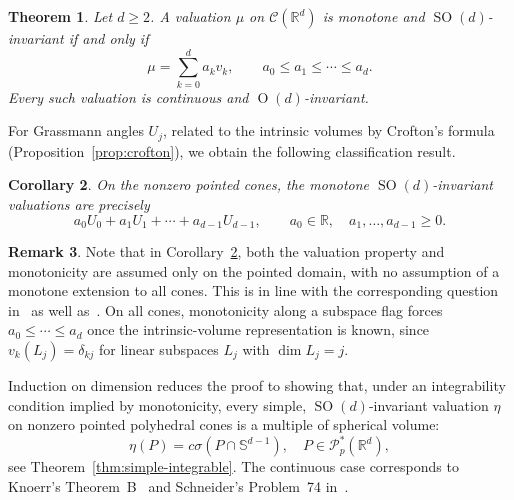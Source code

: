 \documentclass[11pt]{article}
\newcommand{\R}{\mathbb{R}}
\newcommand{\CC}{\mathcal{C}}
\newcommand{\PP}{\mathcal{P}}
\newcommand{\sphere}[1]{\mathbb{S}^{#1}}
\newcommand{\SOn}[1]{\operatorname{SO}(#1)}
\newcommand{\On}[1]{\operatorname{O}(#1)}
\theoremstyle{plain}
\newtheorem{theorem}{Theorem}[section]
\newtheorem{corollary}[theorem]{Corollary}
\theoremstyle{definition}
\newtheorem{remark}[theorem]{Remark}
\begin{document}
\begin{theorem}\label{thm:global-classification}
  Let $d\ge2$.  A valuation $\mu$ on $\CC(\R^d)$ is monotone and
  $\SOn d$-invariant if and only if
  \begin{equation}\label{eq:global-classification}
    \mu=\sum_{k=0}^{d}a_kv_k,
    \qquad a_0\le a_1\le\cdots\le a_d.
  \end{equation}
  Every such valuation is continuous and
  $\On d$-invariant.
  \end{theorem}

For Grassmann angles $U_j$, related to the intrinsic volumes by Crofton's
formula (Proposition~\ref{prop:crofton}), we obtain the following
classification result.

  \begin{corollary}\label{cor:problem49}
    On the nonzero pointed cones, the
    monotone $\SOn d$-invariant valuations
    are precisely
    \[
      a_0U_0+a_1U_1+\cdots+a_{d-1}U_{d-1},
      \qquad a_0\in\R,\quad a_1,\ldots,a_{d-1}\ge0.
    \]
    \end{corollary}

\begin{remark}\label{rem:monotonicity-domains}
Note that in Corollary~\ref{cor:problem49}, both the valuation property and
  monotonicity are assumed only on the pointed domain, with no assumption
  of a monotone extension to all cones. This is in line with the corresponding question in~\cite[Section~3.3, p.~126]{Sch22:Convex-Cones} as well as~\cite[Problem~49]{Gruber1979}.
On all cones, monotonicity along a subspace flag forces
$a_0\le\cdots\le a_d$ once the intrinsic-volume representation is known,
since $v_k(L_j)=\delta_{kj}$ for linear subspaces $L_j$ with $\dim L_j=j$.
\end{remark}


Induction on dimension reduces the proof to showing that, under an
integrability condition implied by monotonicity, every simple,
$\SOn d$-invariant valuation $\eta$ on nonzero pointed polyhedral
cones is a multiple of spherical volume:
\begin{equation}\label{eq:simple-multiple}
  \eta(P)=c \sigma(P\cap \sphere{d-1}), \quad P\in \PP^*_p(\R^d),
\end{equation}
see Theorem~\ref{thm:simple-integrable}.
The continuous case corresponds to
Knoerr's Theorem~B~\cite{Knoerr:Spherical-Hadwiger} and
Schneider's Problem~74 in~\cite{Gruber1979}.
\end{document}
